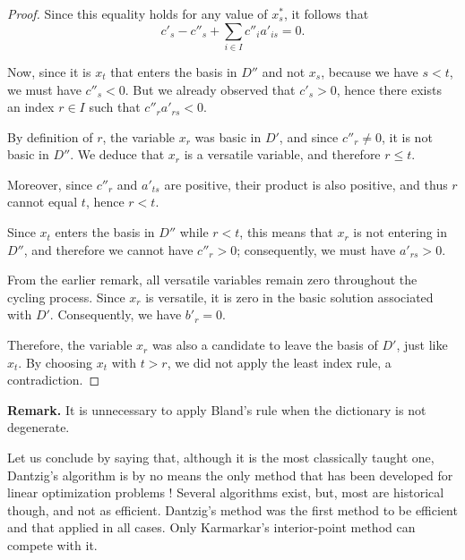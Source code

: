 \begin{proof}
    Since this equality holds for any value of $x^*_s$, it follows that
    \[
    c'_s - c''_s + \sum_{i \in I} c''_i a'_{is} = 0 .
    \]

    Now, since it is $x_t$ that enters the basis in $D''$ and not $x_s$, because we have $s < t$, we must have $c''_s < 0$. But we already observed that $c'_s > 0$, hence there exists an index $r \in I$ such that $c''_r a'_{rs} < 0$.

    By definition of $r$, the variable $x_r$ was basic in $D'$, and since $c''_r \neq 0$, it is not basic in $D''$. We deduce that $x_r$ is a versatile variable, and therefore $r \leqslant t$.

    Moreover, since $c''_r$ and $a'_{ts}$ are positive, their product is also positive, and thus $r$ cannot equal $t$, hence $r < t$.

    Since $x_t$ enters the basis in $D''$ while $r < t$, this means that $x_r$ is not entering in $D''$, and therefore we cannot have $c''_r > 0$; consequently, we must have $a'_{rs} > 0$.

    From the earlier remark, all versatile variables remain zero throughout the cycling process. Since $x_r$ is versatile, it is zero in the basic solution associated with $D'$. Consequently, we have $b'_r = 0$.

    Therefore, the variable $x_r$ was also a candidate to leave the basis of $D'$, just like $x_t$. By choosing $x_t$ with $t > r$, we did not apply the least index rule, a contradiction.
\end{proof}

\textbf{Remark.} It is unnecessary to apply Bland's rule when the dictionary is not degenerate.

Let us conclude by saying that, although it is the most classically taught one, Dantzig's algorithm is by no means the only method that has been developed for linear optimization problems ! Several algorithms exist, but, most are historical though, and not as efficient. Dantzig's method was the first method to be efficient and that applied in all cases. Only Karmarkar's interior-point method \cite{karmarkar1984} can compete with it.